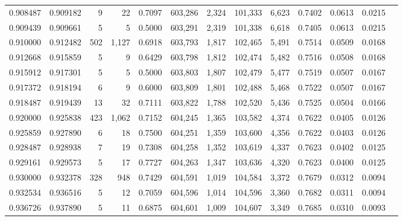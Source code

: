 \begin{tabular}{rrrrrrrrrrrrr}
0.908487 & 0.909182 &      9 &    22 &                                     0.7097 & 603,286 &   2,324 & 101,333 &   6,623 & 0.7402 & 0.0613 & 0.0215 \\
0.909439 & 0.909661 &      5 &     5 &                                     0.5000 & 603,291 &   2,319 & 101,338 &   6,618 & 0.7405 & 0.0613 & 0.0215 \\
0.910000 & 0.912482 &    502 & 1,127 &                                     0.6918 & 603,793 &   1,817 & 102,465 &   5,491 & 0.7514 & 0.0509 & 0.0168 \\
0.912668 & 0.915859 &      5 &     9 &                                     0.6429 & 603,798 &   1,812 & 102,474 &   5,482 & 0.7516 & 0.0508 & 0.0168 \\
0.915912 & 0.917301 &      5 &     5 &                                     0.5000 & 603,803 &   1,807 & 102,479 &   5,477 & 0.7519 & 0.0507 & 0.0167 \\
0.917372 & 0.918194 &      6 &     9 &                                     0.6000 & 603,809 &   1,801 & 102,488 &   5,468 & 0.7522 & 0.0507 & 0.0167 \\
0.918487 & 0.919439 &     13 &    32 &                                     0.7111 & 603,822 &   1,788 & 102,520 &   5,436 & 0.7525 & 0.0504 & 0.0166 \\
0.920000 & 0.925838 &    423 & 1,062 &                                     0.7152 & 604,245 &   1,365 & 103,582 &   4,374 & 0.7622 & 0.0405 & 0.0126 \\
0.925859 & 0.927890 &      6 &    18 &                                     0.7500 & 604,251 &   1,359 & 103,600 &   4,356 & 0.7622 & 0.0403 & 0.0126 \\
0.928487 & 0.928938 &      7 &    19 &                                     0.7308 & 604,258 &   1,352 & 103,619 &   4,337 & 0.7623 & 0.0402 & 0.0125 \\
0.929161 & 0.929573 &      5 &    17 &                                     0.7727 & 604,263 &   1,347 & 103,636 &   4,320 & 0.7623 & 0.0400 & 0.0125 \\
0.930000 & 0.932378 &    328 &   948 &                                     0.7429 & 604,591 &   1,019 & 104,584 &   3,372 & 0.7679 & 0.0312 & 0.0094 \\
0.932534 & 0.936516 &      5 &    12 &                                     0.7059 & 604,596 &   1,014 & 104,596 &   3,360 & 0.7682 & 0.0311 & 0.0094 \\
0.936726 & 0.937890 &      5 &    11 &                                     0.6875 & 604,601 &   1,009 & 104,607 &   3,349 & 0.7685 & 0.0310 & 0.0093 \\

\end{tabular}
